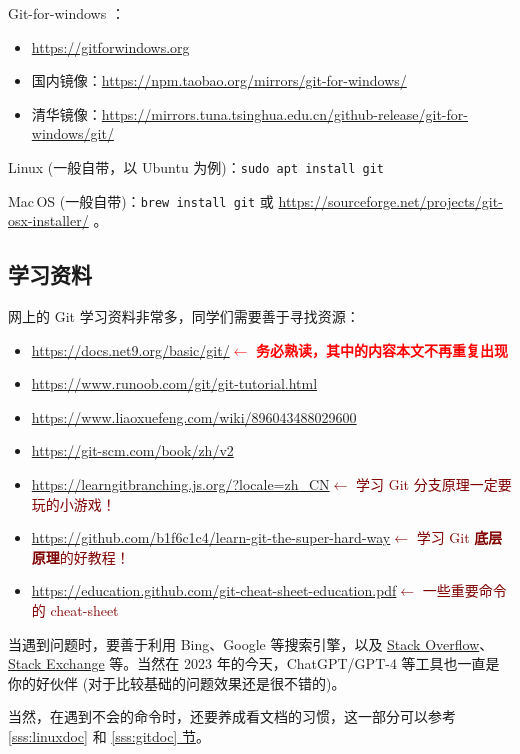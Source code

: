 \documentclass{article}
\begin{document}
	Git-for-windows \cite{sast2021-git}：
	\begin{itemize}
		\itemsep0pt
		\item \url{https://gitforwindows.org}
		\item 国内镜像：\url{https://npm.taobao.org/mirrors/git-for-windows/}
		\item 清华镜像：\url{https://mirrors.tuna.tsinghua.edu.cn/github-release/git-for-windows/git/}
	\end{itemize}

	Linux (一般自带，以 Ubuntu 为例)：\texttt{sudo apt install git}

	Mac\,OS (一般自带)：\texttt{brew install git} 或 \url{https://sourceforge.net/projects/git-osx-installer/} \cite{sast2021-git}。

	\subsection{学习资料}

	网上的 Git 学习资料非常多，同学们需要善于寻找资源：

	\begin{itemize}
		\itemsep0pt
		\item \url{https://docs.net9.org/basic/git/}\quad\textcolor{red}{$\gets$ \textbf{务必熟读，其中的内容本文不再重复出现}}
		\item \url{https://www.runoob.com/git/git-tutorial.html}
		\item \url{https://www.liaoxuefeng.com/wiki/896043488029600}
		\item \url{https://git-scm.com/book/zh/v2}
		\item \url{https://learngitbranching.js.org/?locale=zh_CN}\quad\textcolor{maroon}{$\gets$ 学习 Git 分支原理一定要玩的小游戏！}
		\item \url{https://github.com/b1f6c1c4/learn-git-the-super-hard-way}\quad\textcolor{maroon}{$\gets$ 学习 Git \textbf{底层原理}的好教程！}
		\item \url{https://education.github.com/git-cheat-sheet-education.pdf}\quad\textcolor{maroon}{$\gets$ 一些重要命令的 cheat-sheet}
	\end{itemize}

	当遇到问题时，要善于利用 Bing、Google 等搜索引擎，以及 \href{https://stackoverflow.com/}{Stack Overflow}、\href{https://stackexchange.com/}{Stack Exchange} 等。当然在 2023 年的今天，ChatGPT/GPT-4 等工具也一直是你的好伙伴 (对于比较基础的问题效果还是很不错的)。

	当然，在遇到不会的命令时，还要养成看文档的习惯，这一部分可以参考 \ref{sss:linuxdoc} 和 \hyperref[sss:gitdoc]{\ref*{sss:gitdoc} 节}。
\end{document}
